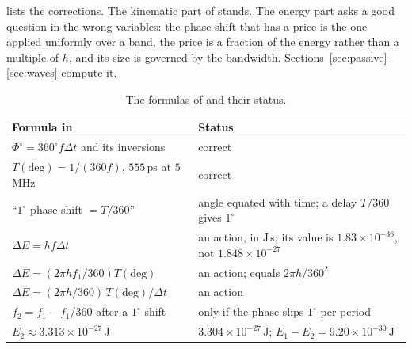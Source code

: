  lists the corrections. The kinematic part of \cite{tb23}
stands. The energy part asks a good question in the wrong variables: the
phase shift that has a price is the one applied uniformly over a band, the
price is a fraction of the energy rather than a multiple of $h$, and its
size is governed by the bandwidth. Sections~\ref{sec:passive}--\ref{sec:waves}
compute it.

\begin{table}[t]
\caption{The formulas of \cite{tb23} and their status.}
\label{tab:audit}
\centering
\small
\begin{tabular}{@{}p{}p{}@{}}
\toprule
Formula in \cite{tb23} & Status \tabularnewline
\midrule
\raggedright $\Phi^\circ=360^\circ f\Delta t$ and its inversions & \raggedright correct\tabularnewline
\raggedright $T(\mathrm{deg})=1/(360f)$, $555$\,ps at $5$\,MHz & \raggedright correct\tabularnewline
\raggedright ``$1^\circ$ phase shift $=T/360$'' & \raggedright angle equated with time; a delay $T/360$ gives $1^\circ$\tabularnewline
\raggedright $\Delta E=hf\Delta t$ & \raggedright an action, in J\,s; its value is $1.83\times10^{-36}$, not $1.848\times10^{-27}$\tabularnewline
\raggedright $\Delta E=(2\pi hf_1/360)T(\mathrm{deg})$ & \raggedright an action; equals $2\pi h/360^2$\tabularnewline
\raggedright $\Delta E=(2\pi h/360)\,T(\mathrm{deg})/\Delta t$ & \raggedright an action\tabularnewline
\raggedright $f_2=f_1-f_1/360$ after a $1^\circ$ shift & \raggedright only if the phase slips $1^\circ$ per period\tabularnewline
\raggedright $E_2\approx3.313\times10^{-27}$\,J & \raggedright $3.304\times10^{-27}$\,J; $E_1-E_2=9.20\times10^{-30}$\,J\tabularnewline
\bottomrule
\end{tabular}
\end{table}
